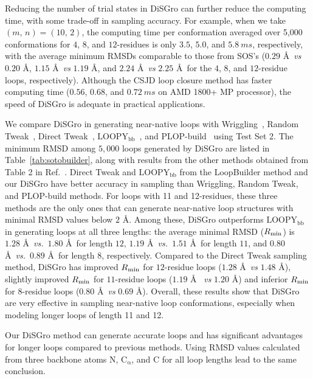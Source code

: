 Reducing the number of trial states in {\sc DiSGro} can further
reduce the computing time, with some trade-off in sampling accuracy.
For example, when we take $(m, \, n)  = (10, \,2)$, the computing
time per conformation averaged over 5,000 conformations for $4$,
$8$, and $12$-residues is only $3.5$, $5.0$, and $5.8\:ms$,
respectively, with the average minimum RMSDs comparable to those
from SOS's ($0.29$ \r{A}\ {\it vs}\/ $0.20$ \r{A}, $1.15$ \r{A}\
{\it vs}\/ $1.19$ \r{A}, and $2.24$ \r{A}\ {\it vs}\/ $2.25$ \r{A}\
for the $4$, $8$, and $12$-residue loops, respectively). Although
the CSJD loop closure method has faster computing time ($0.56$,
$0.68$, and $0.72\:ms$ on AMD 1800+ MP processor), the speed of {\sc
DiSGro} is adequate in practical applications.

We compare {\sc DiSGro} in generating near-native loops with
Wriggling~\cite{cahill2003}, Random Tweak~\cite{shenkin1987}, Direct
Tweak~\cite{xiang2002,soto2008},
$\mathrm{LOOPY_{bb}}$~\cite{xiang2002}, and
PLOP-build~\cite{jacobson2004} using Test Set 2. The minimum RMSD
among $5,000$ loops generated by {\sc DiSGro} are listed in
Table~\ref{tab:sotobuilder}, along with results from the other
methods obtained from Table 2 in Ref.~\cite{soto2008}. Direct Tweak
and $\mathrm{LOOPY_{bb}}$ from the LoopBuilder method and our {\sc
DiSGro} have better accuracy in sampling than Wriggling, Random
Tweak, and PLOP-build methods.  For loops with 11 and 12-residues,
these three methods are the only ones that can generate near-native
loop structures with minimal RMSD values below $2$ \r{A}. Among
these, {\sc DiSGro} outperforms $\mathrm{LOOPY_{bb}}$ in generating
loops at all three lengths: the average minimal RMSD ($R_{\rm
  min}$) is
  $1.28$ \r{A}\ {\it vs.}\ $1.80$ \r{A}\ for length $12$,
  $1.19$ \r{A}\ {\it vs.}\ $1.51$ \r{A}\ for length $11$, and
  $0.80$ \r{A}\ {\it vs.}\ $0.89$ \r{A}\ for length $8$,
  respectively. Compared to the Direct
  Tweak sampling method, {\sc DiSGro} has improved $R_{\rm min}$ for
$12$-residue loops ($1.28$ \r{A}\ {\it vs}\/ $1.48$ \r{A}), slightly
improved $R_{\rm min}$ for $11$-residue loops ($1.19$ \r{A}\ {\it
vs}\/ $1.20$ \r{A}) and inferior $R_{\rm min}$ for $8$-residue loops
($0.80$ \r{A}\ {\it vs}\/ $0.69$ \r{A}).  Overall, these results
show that {\sc DiSGro} are very effective in sampling near-native
loop conformations, especially when modeling longer loops of length
11 and 12.

Our {\sc DiSGro} method can generate accurate loops and has
significant advantages for longer loops compared to previous
methods. Using RMSD values calculated from three backbone atoms N,
$\mathrm{C_{\alpha}}$, and C for all loop lengths lead to the same
conclusion.


